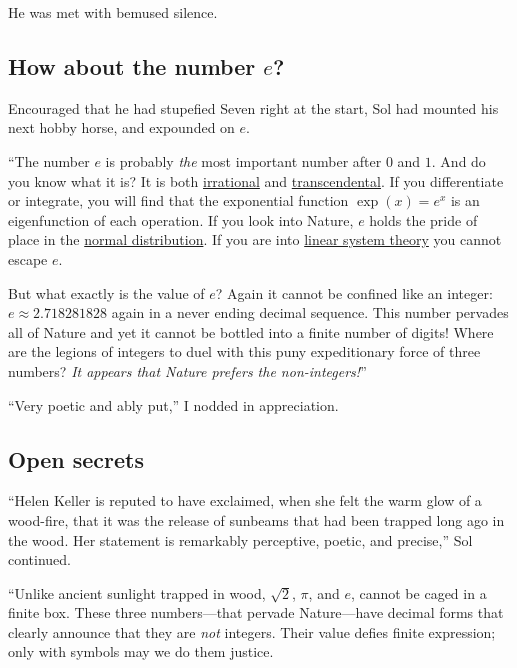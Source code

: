 \documentclass[
  a4paper,
]{article}
\begin{document}
He was met with bemused silence.

\hypertarget{how-about-the-number-e}{%
\subsection{\texorpdfstring{How about the number
\(e\)?}{How about the number e?}}\label{how-about-the-number-e}}

Encouraged that he had stupefied Seven right at the start, Sol had
mounted his next hobby horse, and expounded on \(e\).

``The number \(e\) is probably \emph{the} most important number after
\(0\) and \(1\). And do you know what it is? It is both
\href{https://mathworld.wolfram.com/IrrationalNumber.html}{irrational}
and
\href{https://en.wikipedia.org/wiki/Transcendental_number}{transcendental}.
If you differentiate or integrate, you will find that the exponential
function \(\exp(x) = e^x\) is an eigenfunction of each operation. If you
look into Nature, \(e\) holds the pride of place in the
\href{https://www.khanacademy.org/math/statistics-probability/modeling-distributions-of-data/normal-distributions-library/a/normal-distributions-review}{normal
distribution}. If you are into
\href{https://www.cns.nyu.edu/~david/handouts/linear-systems/linear-systems.html}{linear
system theory} you cannot escape \(e\).

But what exactly is the value of \(e\)? Again it cannot be confined like
an integer: \(e \approx 2.718281828\) again in a never ending decimal
sequence. This number pervades all of Nature and yet it cannot be
bottled into a finite number of digits! Where are the legions of
integers to duel with this puny expeditionary force of three numbers?
\emph{It appears that Nature prefers the non-integers!}''

``Very poetic and ably put,'' I nodded in appreciation.

\hypertarget{open-secrets}{%
\subsection{Open secrets}\label{open-secrets}}

``Helen Keller is reputed to have exclaimed, when she felt the warm glow
of a wood-fire, that it was the release of sunbeams that had been
trapped long ago in the wood. Her statement is remarkably perceptive,
poetic, and precise,'' Sol continued.

``Unlike ancient sunlight trapped in wood, \(\sqrt{2}\), \(\pi\), and
\(e\), cannot be caged in a finite box. These three numbers---that
pervade Nature---have decimal forms that clearly announce that they are
\emph{not} integers. Their value defies finite expression; only with
symbols may we do them justice.
\end{document}
